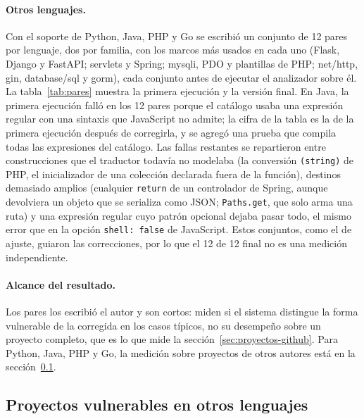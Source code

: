 \paragraph{Otros lenguajes.} Con el soporte de Python, Java, PHP y Go se
escribió un conjunto de 12 pares por lenguaje, dos por familia, con los
marcos más usados en cada uno (Flask, Django y FastAPI; servlets y Spring;
mysqli, PDO y plantillas de PHP; net/http, gin, database/sql y gorm), cada
conjunto antes de ejecutar el analizador sobre él. La
tabla~\ref{tab:pares} muestra la primera ejecución y la versión final. En
Java, la primera ejecución falló en los 12 pares porque el catálogo usaba
una expresión regular con una sintaxis que JavaScript no admite; la cifra
de la tabla es la de la primera ejecución después de corregirla, y se
agregó una prueba que compila todas las expresiones del catálogo. Las
fallas restantes se repartieron entre construcciones que el traductor
todavía no modelaba (la conversión \texttt{(string)} de PHP, el
inicializador de una colección declarada fuera de la función), destinos
demasiado amplios (cualquier \texttt{return} de un controlador de Spring,
aunque devolviera un objeto que se serializa como JSON; \texttt{Paths.get},
que solo arma una ruta) y una expresión regular cuyo patrón opcional dejaba
pasar todo, el mismo error que en la opción \texttt{shell: false} de
JavaScript. Estos conjuntos, como el de ajuste, guiaron las correcciones,
por lo que el 12 de 12 final no es una medición independiente.

\paragraph{Alcance del resultado.} Los pares los escribió el autor y son
cortos: miden si el sistema distingue la forma vulnerable de la corregida
en los casos típicos, no su desempeño sobre un proyecto completo, que es
lo que mide la sección~\ref{sec:proyectos-github}. Para Python, Java, PHP
y Go, la medición sobre proyectos de otros autores está en la
sección~\ref{sec:otros-lenguajes}.

\subsection{Proyectos vulnerables en otros lenguajes}\label{sec:otros-lenguajes}


